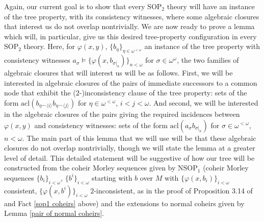 \documentclass{amsart}
\theoremstyle{definition}
\theoremstyle{remark}
\numberwithin{equation}{section}
\begin{document}
Again, our current goal is to show that every $ \mathrm{SOP}_{2}$ theory will have an instance of the tree property, with its consistency witnesses, where some algebraic closures that interest us do not overlap nontrivially. We are now ready to prove a lemma which will, in particular, give us this desired tree-property configuration in every $\mathrm{SOP}_{2}$ theory. Here, for $\varphi(x,y)$, $\{b_{\eta}\}_{\eta \in \omega^{< \omega}}$  an instance of the tree property with consistency witnesses $a_{\sigma} \models \{ \varphi(x, b_{\sigma|_{n}})\}_{n < \omega}$ for $\sigma \in \omega^{\omega}$, the two families of algebraic closures that will interest us will be as follows. First, we will be interested in algebraic closures of the pairs of immediate successors to a common node that exhibit the ($2$-)inconsistency clause of the tree property: sets of the form $\mathrm{acl}(b_{\eta \smallfrown \langle i \rangle}b_{\eta \smallfrown \langle j \rangle})$ for $\eta \in \omega^{< \omega} $,  $i < j < \omega$. And second, we will be interested in the algebraic closures of the pairs giving the required incidences between $\varphi(x, y)$ and consistency witnesses: sets of the form  $\mathrm{acl}(a_{\sigma}b_{\sigma|_{n}})$ for $\sigma \in \omega^{<\omega}$, $n < \omega$. The main part of this lemma that we will use will be that these algebraic closures do not overlap nontrivially, though we will state the lemma at a greater level of detail. This detailed statement will be suggestive of how our tree will be constructed from the coheir Morley sequences given by $\mathrm{NSOP}_{1}$ (coheir Morley sequences $\{b_i\}_{i < \omega} $, $\{b^i\}_{i < \omega}$ starting with $b$ over $M$ with $\{\varphi(x, b_{i})\}_{i < \omega}$ consistent, $\{\varphi(x, b^{i})\}_{i < \omega}$ $2$-inconsistent, as in the proof of Proposition 3.14 of \cite{KR17} and Fact \ref{sop1 coheirs} above) and the extensions to normal coheirs given by Lemma \ref{pair of normal coheirs}. 
\end{document}
